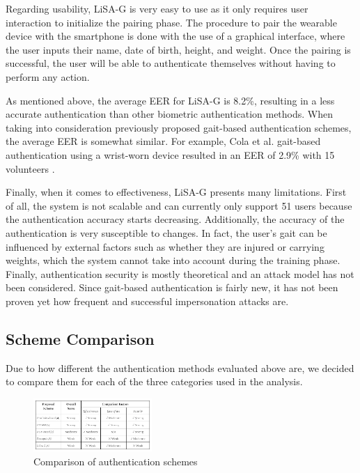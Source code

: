\documentclass[10pt,twocolumn,letterpaper]{article}
\begin{document}
Regarding usability, LiSA-G is very easy to use as it only requires user interaction to initialize the pairing phase. The procedure to pair the wearable device with the smartphone is done with the use of a graphical interface, where the user inputs their name, date of birth, height, and weight. Once the pairing is successful, the user will be able to authenticate themselves without having to perform any action.

As mentioned above, the average EER for LiSA-G is 8.2\%, resulting in a less accurate authentication than other biometric authentication methods. When taking into consideration previously proposed gait-based authentication schemes, the average EER is somewhat similar. For example, Cola et al. \cite{cola_gait} gait-based authentication using a wrist-worn device resulted in an EER of 2.9\% with 15 volunteers \cite{cola_gait}.

Finally, when it comes to effectiveness, LiSA-G presents many limitations. First of all, the system is not scalable and can currently only support 51 users because the authentication accuracy starts decreasing. Additionally, the accuracy of the authentication is very susceptible to changes. In fact, the user’s gait can be influenced by external factors such as whether they are injured or carrying weights, which the system cannot take into account during the training phase. Finally, authentication security is mostly theoretical and an attack model has not been considered. Since gait-based authentication is fairly new, it has not been proven yet how frequent and successful impersonation attacks are.


\subsection{Scheme Comparison}

Due to how different the authentication methods evaluated above are, we decided to compare them for each of the three categories used in the analysis.

\begin{figure}[ht!]
  \centering
  \includegraphics[width=0.4\textwidth]{comparison_table.png}
  \caption{Comparison of authentication schemes}
\end{figure}
\end{document}
